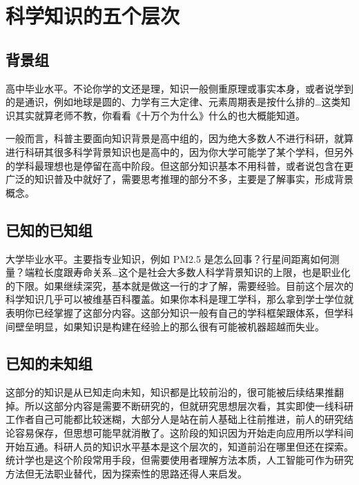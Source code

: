 \documentclass[]{tufte-book}
\begin{document}
\hypertarget{ux79d1ux5b66ux77e5ux8bc6ux7684ux4e94ux4e2aux5c42ux6b21}{%
\section{科学知识的五个层次}\label{ux79d1ux5b66ux77e5ux8bc6ux7684ux4e94ux4e2aux5c42ux6b21}}

\hypertarget{ux80ccux666fux7ec4}{%
\subsection{背景组}\label{ux80ccux666fux7ec4}}

高中毕业水平。不论你学的文还是理，知识一般侧重原理或事实本身，或者说学到的是通识，例如地球是圆的、力学有三大定律、元素周期表是按什么排的\ldots 这类知识其实就算老师不教，你看看《十万个为什么》什么的也大概能知道。

一般而言，科普主要面向知识背景是高中组的，因为绝大多数人不进行科研，就算进行科研其很多科学背景知识也是高中的，因为你大学可能学了某个学科，但另外的学科最理想也是停留在高中阶段。但这部分知识基本不用科普，或者说包含在更广泛的知识普及中就好了，需要思考推理的部分不多，主要是了解事实，形成背景概念。

\hypertarget{ux5df2ux77e5ux7684ux5df2ux77e5ux7ec4}{%
\subsection{已知的已知组}\label{ux5df2ux77e5ux7684ux5df2ux77e5ux7ec4}}

大学毕业水平。主要指专业知识，例如 PM2.5 是怎么回事？行星间距离如何测量？端粒长度跟寿命关系\ldots 这个是社会大多数人科学背景知识的上限，也是职业化的下限。如果继续深究，基本就是做这一行的才了解，需要经验。目前这个层次的科学知识几乎可以被维基百科覆盖。如果你本科是理工学科，那么拿到学士学位就表明你已经掌握了这部分内容。这部分知识一般有自己的学科框架跟体系，但学科间壁垒明显，如果知识是构建在经验上的那么很有可能被机器超越而失业。

\hypertarget{ux5df2ux77e5ux7684ux672aux77e5ux7ec4}{%
\subsection{已知的未知组}\label{ux5df2ux77e5ux7684ux672aux77e5ux7ec4}}

这部分的知识是从已知走向未知，知识都是比较前沿的，很可能被后续结果推翻掉。所以这部分内容是需要不断研究的，但就研究思想层次看，其实即使一线科研工作者自己可能都比较迷糊，大部分人是站在前人基础上往前推进，前人的研究结论容易保存，但思想可能早就消散了。这阶段的知识因为开始走向应用所以学科间开始互通。科研人员的知识水平基本是这个层次的，知道前沿在哪里但还在探索。统计学也是这个阶段常用手段，但需要使用者理解方法本质，人工智能可作为研究方法但无法职业替代，因为探索性的思路还得人来启发。
\end{document}
